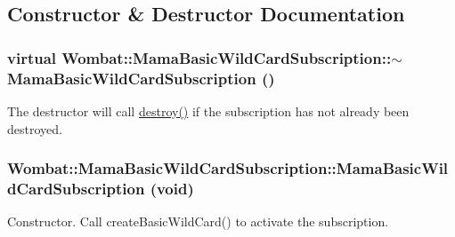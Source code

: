 \subsection{Constructor \& Destructor Documentation}
\hypertarget{classWombat_1_1MamaBasicWildCardSubscription_a95396711c2631fa095cce444676c686c}{
\subsubsection[{$\sim$MamaBasicWildCardSubscription}]{\setlength{\rightskip}{0pt plus 5cm}virtual Wombat::MamaBasicWildCardSubscription::$\sim$MamaBasicWildCardSubscription ()}}
\label{classWombat_1_1MamaBasicWildCardSubscription_a95396711c2631fa095cce444676c686c}


The destructor will call {\ttfamily \hyperlink{classWombat_1_1MamaBasicSubscription_a296c25c10faa885e408e064a626ce3dd}{destroy()}} if the subscription has not already been destroyed. \hypertarget{classWombat_1_1MamaBasicWildCardSubscription_a617b4191e0b7b9db769525a602249062}{
\subsubsection[{MamaBasicWildCardSubscription}]{\setlength{\rightskip}{0pt plus 5cm}Wombat::MamaBasicWildCardSubscription::MamaBasicWildCardSubscription (void)}}
\label{classWombat_1_1MamaBasicWildCardSubscription_a617b4191e0b7b9db769525a602249062}


Constructor. Call createBasicWildCard() to activate the subscription. 

